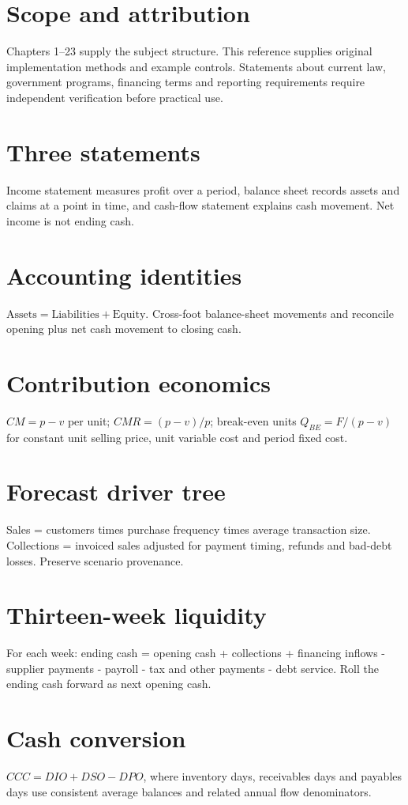 \documentclass[11pt]{article}
\begin{document}
\SuiteOpen\tableofcontents
\section{Scope and attribution}
Chapters 1--23 supply the subject structure. This reference supplies original implementation methods and example controls. Statements about current law, government programs, financing terms and reporting requirements require independent verification before practical use.
\section{Three statements}
Income statement measures profit over a period, balance sheet records assets and claims at a point in time, and cash-flow statement explains cash movement. Net income is not ending cash.
\section{Accounting identities}
$\mathrm{Assets}=\mathrm{Liabilities}+\mathrm{Equity}$. Cross-foot balance-sheet movements and reconcile opening plus net cash movement to closing cash.
\section{Contribution economics}
$CM=p-v$ per unit; $CMR=(p-v)/p$; break-even units $Q_{BE}=F/(p-v)$ for constant unit selling price, unit variable cost and period fixed cost.
\section{Forecast driver tree}
Sales = customers times purchase frequency times average transaction size. Collections = invoiced sales adjusted for payment timing, refunds and bad-debt losses. Preserve scenario provenance.
\section{Thirteen-week liquidity}
For each week: ending cash = opening cash + collections + financing inflows - supplier payments - payroll - tax and other payments - debt service. Roll the ending cash forward as next opening cash.
\section{Cash conversion}
$CCC=DIO+DSO-DPO$, where inventory days, receivables days and payables days use consistent average balances and related annual flow denominators.
\end{document}
